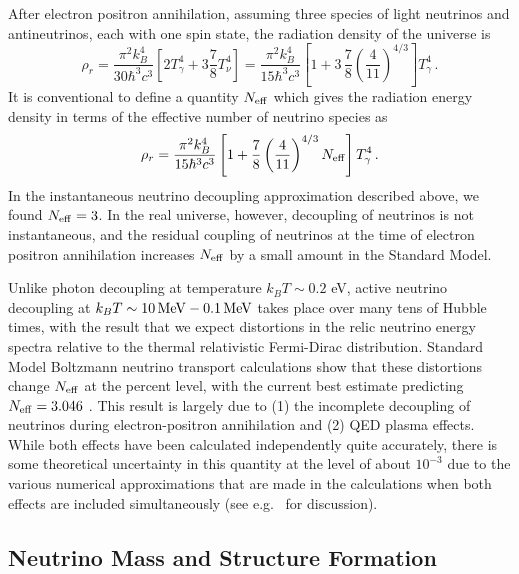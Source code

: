After electron positron annihilation, assuming three species of light neutrinos and antineutrinos, each with one spin state, the radiation density of the universe is
\begin{equation}
	\rho_r = \frac{\pi^2k_B^4}{30\hbar^3 c^3}\left[2T_\gamma^4 + 3\frac{7}{8}T_\nu^4\right] = \frac{\pi^2k_B^4}{15\hbar^3 c^3}\left[1+3\,\frac{7}{8}\left(\frac{4}{11}\right)^{4/3}\right] T_\gamma^4 \, .
\end{equation}
It is conventional to define a quantity $N_{\rm eff}$ which gives the radiation energy density in terms of the effective number of neutrino species as
\begin{equation}\label{eq:rho_r_Neff}
	\rho_r = \frac{\pi^2k_B^4}{15\hbar^3 c^3}\left[1+\frac{7}{8}\left(\frac{4}{11}\right)^{4/3}N_{\rm eff}\right] T_\gamma^4 \, .
\end{equation}
In the instantaneous neutrino decoupling approximation described above, we found $N_{\rm eff} = 3$.  In the real universe, however, decoupling of neutrinos is not instantaneous, and the residual coupling of neutrinos at the time of electron positron annihilation increases $N_{\rm eff}$ by a small amount in the Standard Model.

Unlike photon decoupling at temperature $k_B T \sim 0.2$ eV, active neutrino decoupling at $k_B T \sim 10 \, {\rm MeV} - 0.1 \, {\rm MeV}$ takes place over many tens of Hubble times, with the result that we expect distortions in the relic neutrino energy spectra relative to the thermal relativistic Fermi-Dirac distribution. Standard Model Boltzmann neutrino transport calculations show that these distortions change $N_{\rm eff}$ at the percent level, with the current best estimate predicting $N_{\rm eff} = 3.046$ \cite{Mangano:2005cc}.   This result is largely due to (1) the incomplete decoupling of neutrinos during electron-positron annihilation and (2) QED plasma effects.  While both effects have been calculated independently quite accurately, there is some theoretical uncertainty in this quantity at the level of about $10^{-3}$ due to the various numerical approximations that are made in the calculations when both effects are included simultaneously (see e.g.~\cite{Grohs:2015tfy} for discussion).  



\subsection{Neutrino Mass and Structure Formation}
\label{ssec:numasstheoryreview}

